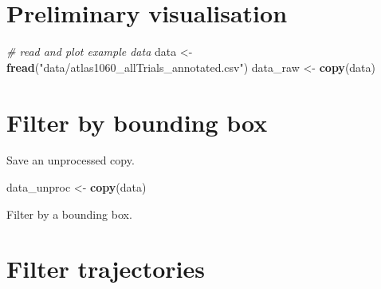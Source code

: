 \documentclass[
]{scrreprt}
\newenvironment{Shaded}{}{}
\newcommand{\CommentTok}[1]{\textcolor[rgb]{0.38,0.63,0.69}{\textit{#1}}}
\newcommand{\DataTypeTok}[1]{\textcolor[rgb]{0.56,0.13,0.00}{#1}}
\newcommand{\DecValTok}[1]{\textcolor[rgb]{0.25,0.63,0.44}{#1}}
\newcommand{\KeywordTok}[1]{\textcolor[rgb]{0.00,0.44,0.13}{\textbf{#1}}}
\newcommand{\NormalTok}[1]{#1}
\newcommand{\OperatorTok}[1]{\textcolor[rgb]{0.40,0.40,0.40}{#1}}
\newcommand{\OtherTok}[1]{\textcolor[rgb]{0.00,0.44,0.13}{#1}}
\newcommand{\StringTok}[1]{\textcolor[rgb]{0.25,0.44,0.63}{#1}}
\begin{document}
\hypertarget{preliminary-visualisation}{%
\section{Preliminary visualisation}\label{preliminary-visualisation}}

\begin{Shaded}
\begin{Highlighting}[]
\CommentTok{\# read and plot example data}
\NormalTok{data <{-}}\StringTok{ }\KeywordTok{fread}\NormalTok{(}\StringTok{"data/atlas1060\_allTrials\_annotated.csv"}\NormalTok{)}
\NormalTok{data\_raw <{-}}\StringTok{ }\KeywordTok{copy}\NormalTok{(data)}
\end{Highlighting}
\end{Shaded}

\hypertarget{filter-by-bounding-box}{%
\section{Filter by bounding box}\label{filter-by-bounding-box}}

Save an unprocessed copy.

\begin{Shaded}
\begin{Highlighting}[]
\NormalTok{data\_unproc <{-}}\StringTok{ }\KeywordTok{copy}\NormalTok{(data)}
\end{Highlighting}
\end{Shaded}

Filter by a bounding box.

\begin{Shaded}
\end{Shaded}

\hypertarget{filter-trajectories}{%
\section{Filter trajectories}\label{filter-trajectories}}
\end{document}
